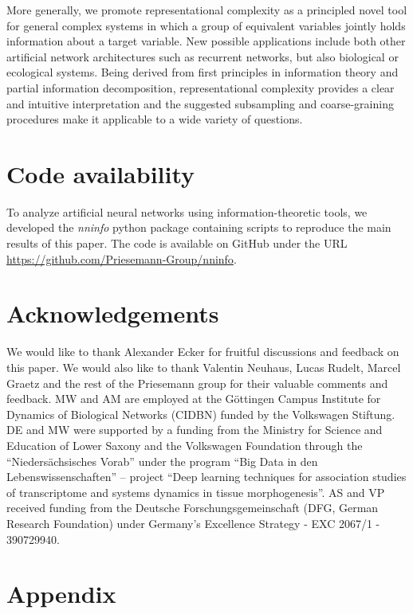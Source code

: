 \documentclass[10pt]{article}
\theoremstyle{definition}
\theoremstyle{plain}
\begin{document}
More generally, we promote representational complexity as a principled novel tool for general complex systems in which a group of equivalent variables jointly holds information about a target variable. New possible applications include both other artificial network architectures such as recurrent networks, but also biological  or ecological systems. Being derived from first principles in information theory and partial information decomposition, representational complexity provides a clear and intuitive interpretation and the suggested subsampling and coarse-graining procedures make it applicable to a wide variety of questions.

\section*{Code availability}
To analyze artificial neural networks using information-theoretic tools, we developed the \emph{nninfo} python package containing scripts to reproduce the main results of this paper. The code is available on GitHub under the URL \url{https://github.com/Priesemann-Group/nninfo}.

\section*{Acknowledgements}
We would like to thank Alexander Ecker for fruitful discussions and feedback on this paper.  We would also like to thank Valentin Neuhaus, Lucas Rudelt, Marcel Graetz and the rest of the Priesemann group for their valuable comments and feedback. MW and AM are employed at the Göttingen Campus Institute for Dynamics of Biological Networks (CIDBN) funded by the Volkswagen Stiftung. DE and MW were supported by a funding from the Ministry for Science and Education of Lower Saxony and the Volkswagen Foundation through the “Niedersächsisches Vorab” under the program ``Big Data in den Lebenswissenschaften'' -- project ``Deep learning techniques for association studies of transcriptome and systems dynamics in tissue morphogenesis''. AS and VP received funding from the Deutsche Forschungsgemeinschaft (DFG, German Research Foundation) under Germany’s Excellence Strategy - EXC 2067/1 - 390729940.
\clearpage



\clearpage


\appendix
\section{Appendix}
\end{document}
